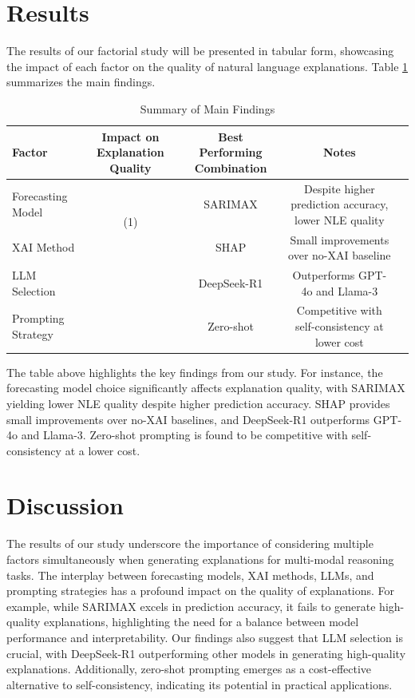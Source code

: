 \section{Results}
\label{sec:results}
The results of our factorial study will be presented in tabular form, showcasing the impact of each factor on the quality of natural language explanations. Table \ref{tab:results} summarizes the main findings.

\begin{table}[htbp]
\centering
\begin{tabular}{|l|c|c|c|c|}
\hline
Factor & Impact on Explanation Quality & Best Performing Combination & Notes \\
\hline
Forecasting Model & \multirow{2}{*}{(1)} & SARIMAX & Despite higher prediction accuracy, lower NLE quality \\
XAI Method & & SHAP & Small improvements over no-XAI baseline \\
LLM Selection & & DeepSeek-R1 & Outperforms GPT-4o and Llama-3 \\
Prompting Strategy & & Zero-shot & Competitive with self-consistency at lower cost \\
\hline
\end{tabular}
\caption{Summary of Main Findings}
\label{tab:results}
\end{table}

The table above highlights the key findings from our study. For instance, the forecasting model choice significantly affects explanation quality, with SARIMAX yielding lower NLE quality despite higher prediction accuracy. SHAP provides small improvements over no-XAI baselines, and DeepSeek-R1 outperforms GPT-4o and Llama-3. Zero-shot prompting is found to be competitive with self-consistency at a lower cost.

\section{Discussion}
\label{sec:discussion}
The results of our study underscore the importance of considering multiple factors simultaneously when generating explanations for multi-modal reasoning tasks. The interplay between forecasting models, XAI methods, LLMs, and prompting strategies has a profound impact on the quality of explanations. For example, while SARIMAX excels in prediction accuracy, it fails to generate high-quality explanations, highlighting the need for a balance between model performance and interpretability. Our findings also suggest that LLM selection is crucial, with DeepSeek-R1 outperforming other models in generating high-quality explanations. Additionally, zero-shot prompting emerges as a cost-effective alternative to self-consistency, indicating its potential in practical applications.

